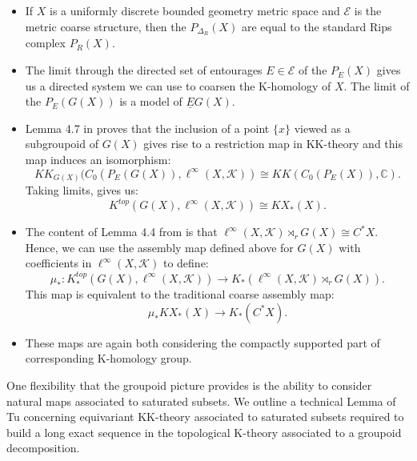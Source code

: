 \begin{conjecture}
{\begin{remark}
\begin{itemize}
\item If $X$ is a uniformly discrete bounded geometry metric space and $\mathcal{E}$ is the metric coarse structure, then the $P_{\Delta_{R}}(X)$ are equal to the standard Rips complex $P_{R}(X)$.
\item The limit through the directed set of entourages $E \in \mathcal{E}$ of the $P_{E}(X)$ gives us a directed system we can use to coarsen the K-homology of $X$. The limit of the $P_{E}(G(X))$ is a model of $\underline{E}G(X)$.
\item Lemma 4.7 in \cite{MR1905840} proves that the inclusion of a point $\lbrace x \rbrace$ viewed as a subgroupoid of $G(X)$ gives rise to a restriction map in KK-theory and this map induces an isomorphism:
\begin{equation*}
KK_{G(X)}(C_{0}(P_{E}(G(X)),\ell^{\infty}(X,\mathcal{K})) \cong KK(C_{0}(P_{E}(X)),\mathbb{C}).
\end{equation*}
Taking limits, gives us:
\begin{equation*}
K^{top}(G(X),\ell^{\infty}(X,\mathcal{K})) \cong KX_{*}(X).
\end{equation*}
\item The content of Lemma 4.4 from \cite{MR1905840} is that $\ell^{\infty}(X,\mathcal{K}) \rtimes_{r} G(X) \cong C^{*}X$. Hence, we can use the assembly map defined above for $G(X)$ with coefficients in $\ell^{\infty}(X,\mathcal{K})$ to define:
\begin{equation*}
\mu_{*}:K^{top}_{*}(G(X),\ell^{\infty}(X,\mathcal{K})) \rightarrow K_{*}(\ell^{\infty}(X,\mathcal{K})\rtimes_{r}G(X)).
\end{equation*}
This map is equivalent to the traditional coarse assembly map:
\begin{equation*}
\mu_{*}KX_{*}(X)\rightarrow K_{*}(C^{*}X).
\end{equation*}
\item These maps are again both considering the compactly supported part of corresponding K-homology group.
\end{itemize}
\end{remark}

One flexibility that the groupoid picture provides is the ability to consider natural maps associated to saturated subsets. We outline a technical Lemma of Tu concerning equivariant KK-theory associated to saturated subsets required to build a long exact sequence in the topological K-theory associated to a groupoid decomposition.

}
\end{conjecture}
